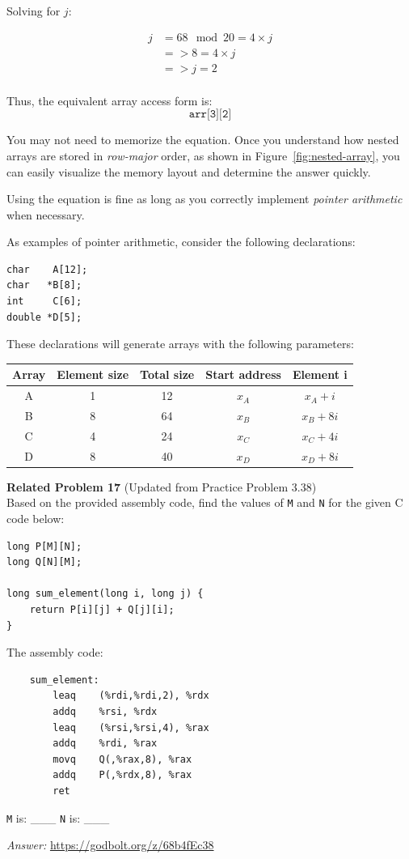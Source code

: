 Solving for \( j \):

\begin{align*}
j &= 68 \mod 20 = 4 \times j \\
  &=> 8 = 4 \times j \\
  &=> j = 2 \\
\end{align*}

Thus, the equivalent array access form is:
\[
\texttt{arr[3][2]}
\]

You may not need to memorize the equation. Once you understand how nested arrays are stored in \textit{row-major} order, as shown in Figure~\ref{fig:nested-array}, you can easily visualize the memory layout and determine the answer quickly. 

Using the equation is fine as long as you correctly implement \textit{pointer arithmetic} when necessary.

As examples of pointer arithmetic, consider the following declarations:

\begin{verbatim}
char    A[12];
char   *B[8];
int     C[6];
double *D[5];
\end{verbatim}

These declarations will generate arrays with the following parameters:
\begin{table}[h]
    \centering
    \begin{tabular}{c c c c c}
        \toprule
        \textbf{Array} & \textbf{Element size} & \textbf{Total size} & \textbf{Start address} & \textbf{Element i} \\ %
        \midrule
        A & 1  & 12  & \( x_A \)  & \( x_A + i \) \\ %
        B & 8  & 64  & \( x_B \)  & \( x_B + 8i \) \\ 
        C & 4  & 24  & \( x_C \)  & \( x_C + 4i \) \\ 
        D & 8  & 40  & \( x_D \)  & \( x_D + 8i \) \\ 
        \bottomrule
    \end{tabular}
\end{table}

\noindent\textbf{Related Problem 17} (Updated from Practice Problem 3.38) \\
Based on the provided assembly code, find the values of \texttt{M} and \texttt{N} for the given C code below:
\begin{verbatim}
long P[M][N];
long Q[N][M];

long sum_element(long i, long j) {
    return P[i][j] + Q[j][i];
}
\end{verbatim}
The assembly code:
\begin{verbatim}
    sum_element:
        leaq    (%rdi,%rdi,2), %rdx
        addq    %rsi, %rdx
        leaq    (%rsi,%rsi,4), %rax
        addq    %rdi, %rax
        movq    Q(,%rax,8), %rax
        addq    P(,%rdx,8), %rax
        ret
\end{verbatim}

\noindent\texttt{M} is: \_\_\_ \newline
\texttt{N} is: \_\_\_ 

\textit{Answer: }\url{https://godbolt.org/z/68b4fEc38} 
\clearpage